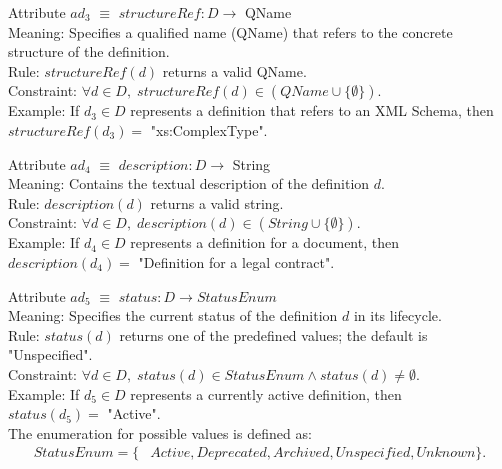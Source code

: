 \documentclass{article}
\begin{document}
Attribute \( ad_3 \) $\equiv$ \( structureRef : D \rightarrow \) QName \\
Meaning: Specifies a qualified name (QName) that refers to the concrete structure of the definition. \\
Rule: \( structureRef(d) \) returns a valid QName. \\
Constraint: \( \forall d \in D,\; structureRef(d) \in (QName \cup \{\emptyset\}) \). \\
Example: If \( d_3 \in D \) represents a definition that refers to an XML Schema, then \\ 
\( structureRef(d_3) = \) "xs:ComplexType".

\vspace{0.8em}

Attribute \( ad_4 \) $\equiv$ \( description : D \rightarrow \) String \\
Meaning: Contains the textual description of the definition \( d \). \\
Rule: \( description(d) \) returns a valid string. \\
Constraint: \( \forall d \in D,\; description(d) \in (String \cup \{\emptyset\}) \). \\
Example: If \( d_4 \in D \) represents a definition for a document, then \\ 
\( description(d_4) = \) "Definition for a legal contract".

\vspace{0.8em}

Attribute \( ad_5 \) $\equiv$ \( status : D \rightarrow \mathit{StatusEnum} \) \\
Meaning: Specifies the current status of the definition \( d \) in its lifecycle. \\
Rule: \( status(d) \) returns one of the predefined values; the default is "Unspecified". \\
Constraint: \( \forall d \in D,\; status(d) \in \mathit{StatusEnum} \wedge status(d) \neq \emptyset \). \\
Example: If \( d_5 \in D \) represents a currently active definition, then \\ 
\( status(d_5) = \) "Active". \\
The enumeration for possible values is defined as:
{\begin{align*}
StatusEnum = \{ &Active, Deprecated, Archived, Unspecified, Unknown \}.
\end{align*}}

\vspace{0.8em}
\end{document}
